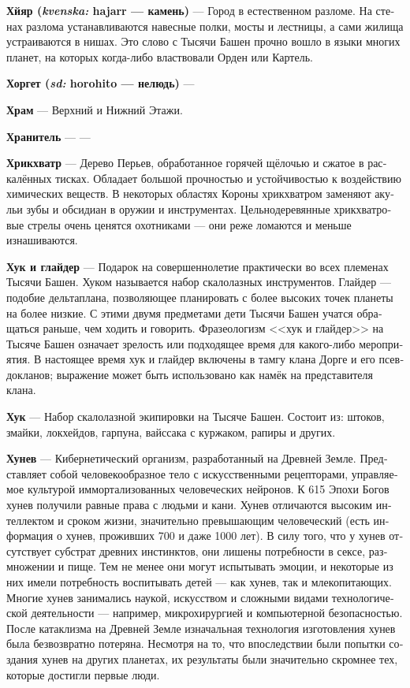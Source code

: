 \documentclass[a4paper,12pt,fleqn]{book}\usepackage{polyglossia}\setdefaultlanguage[babelshorthands=true]{russian}\setotherlanguage{english}\defaultfontfeatures{Ligatures=TeX,Mapping=tex-text}\usepackage{xcolor}\newcommand{\ml}[3]{#2}
\newcommand{\theterm}[3]{\textbf{\hypertarget{#1}{#2}} --- #3}
\newcommand{\theorigin}[3]{\textit{#1:} #2 --- #3}
\begin{document}
{\theterm{hjar}
{Хйяр (\theorigin{kvenska}{hajarr}{камень})}
{Город в естественном разломе.
На стенах разлома устанавливаются навесные полки, мосты и лестницы, а сами жилища устраиваются в нишах.
Это слово с Тысячи Башен прочно вошло в языки многих планет, на которых когда-либо властвовали Орден или Картель.}

\theterm{jorget}
{Хоргет (\theorigin{sd}{horohito}{нелюдь})}
{}

\theterm{temple}
{Храм}
{Верхний и Нижний Этажи.}

\theterm{keeper}
{Хранитель}
{---}

\theterm{chrikchuatr}
{Хрикхватр}
{Дерево Перьев, обработанное горячей щёлочью и сжатое в раскалённых тисках.
Обладает большой прочностью и устойчивостью к воздействию химических веществ.
В некоторых областях Короны хрикхватром заменяют акульи зубы и обсидиан в оружии и инструментах.
Цельнодеревянные хрикхватровые стрелы очень ценятся охотниками --- они реже ломаются и меньше изнашиваются.}

\theterm{hook-n-glider}
{Хук и глайдер}
{Подарок на совершеннолетие практически во всех племенах Тысячи Башен.
Хуком называется набор скалолазных инструментов.
Глайдер --- подобие дельтаплана, позволяющее планировать с более высоких точек планеты на более низкие.
С этими двумя предметами дети Тысячи Башен учатся обращаться раньше, чем ходить и говорить.
Фразеологизм <<хук и глайдер>> на Тысяче Башен означает зрелость или подходящее время для какого-либо мероприятия.
В настоящее время хук и глайдер включены в тамгу клана Дорге и его псевдокланов;
выражение может быть использовано как намёк на представителя клана.}

\theterm{hook}
{Хук}
{Набор скалолазной экипировки на Тысяче Башен.
Состоит из: штоков, змайки, локхейдов, гарпуна, вайссака с куржаком, рапиры и других.}

\theterm{huneu} %
{Хунев}
{Кибернетический организм, разработанный на Древней Земле.
Представляет собой человекообразное тело с искусственными рецепторами, управляемое культурой иммортализованных человеческих нейронов.
К 615 Эпохи Богов хунев получили равные права с людьми и кани.
Хунев отличаются высоким интеллектом и сроком жизни, значительно превышающим человеческий (есть информация о хунев, проживших 700 и даже 1000 лет).
В силу того, что у хунев отсутствует субстрат древних инстинктов, они лишены потребности в сексе, размножении и пище.
Тем не менее они могут испытывать эмоции, и некоторые из них имели потребность воспитывать детей --- как хунев, так и млекопитающих.
Многие хунев занимались наукой, искусством и сложными видами технологической деятельности --- например, микрохирургией и компьютерной безопасностью.
После катаклизма на Древней Земле изначальная технология изготовления хунев была безвозвратно потеряна.
Несмотря на то, что впоследствии были попытки создания хунев на других планетах, их результаты были значительно скромнее тех, которые достигли первые люди.}

}
\end{document}
